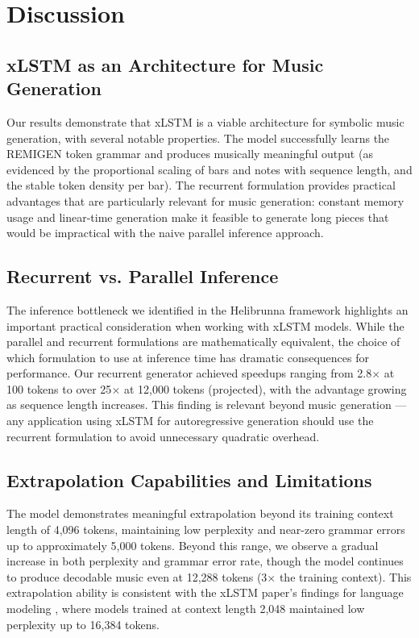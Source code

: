 \documentclass[conference]{IEEEtran}
\begin{document}
\section{Discussion}
\label{sec:discussion}

\subsection{xLSTM as an Architecture for Music Generation}

Our results demonstrate that xLSTM is a viable architecture for symbolic music generation, with several notable properties. The model successfully learns the REMIGEN token grammar and produces musically meaningful output (as evidenced by the proportional scaling of bars and notes with sequence length, and the stable token density per bar). The recurrent formulation provides practical advantages that are particularly relevant for music generation: constant memory usage and linear-time generation make it feasible to generate long pieces that would be impractical with the naive parallel inference approach.

\subsection{Recurrent vs. Parallel Inference}

The inference bottleneck we identified in the Helibrunna framework highlights an important practical consideration when working with xLSTM models. While the parallel and recurrent formulations are mathematically equivalent, the choice of which formulation to use at inference time has dramatic consequences for performance. Our recurrent generator achieved speedups ranging from 2.8$\times$ at 100 tokens to over 25$\times$ at 12,000 tokens (projected), with the advantage growing as sequence length increases. This finding is relevant beyond music generation --- any application using xLSTM for autoregressive generation should use the recurrent formulation to avoid unnecessary quadratic overhead.

\subsection{Extrapolation Capabilities and Limitations}

The model demonstrates meaningful extrapolation beyond its training context length of 4,096 tokens, maintaining low perplexity and near-zero grammar errors up to approximately 5,000 tokens. Beyond this range, we observe a gradual increase in both perplexity and grammar error rate, though the model continues to produce decodable music even at 12,288 tokens (3$\times$ the training context). This extrapolation ability is consistent with the xLSTM paper's findings for language modeling \cite{beck2024xlstm}, where models trained at context length 2,048 maintained low perplexity up to 16,384 tokens.
\end{document}
